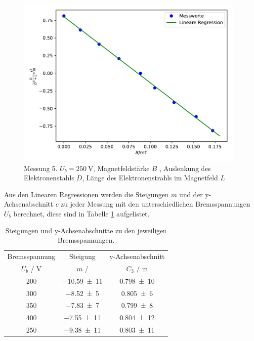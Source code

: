 \begin{figure}
  \centering
  \includegraphics[scale = 0.7]{Plot2.5.pdf}
  \caption{Messung 5. $ U_b = \SI{250}{\volt}$, Magnetfeldstärke $B$ , Auslenkung des Elektronenstahls $D$, Länge des Elektronenstrahls im Magnetfeld $L$}
  \label{abb:11}
\end{figure}


Aus den Linearen Regressionen werden die Steigungen $m$ und der y-Achsenabschnitt $c$ zu jeder Messung mit den unterschiedlichen
Bremsspannungen $U_b$ berechnet, diese sind in Tabelle \ref{tab:6} aufgelistet.


\begin{table}
  \centering
  \caption{Steigungen und y-Achsenabschnitte zu den jeweiligen Bremsspannungen.}
  \begin{tabular}{c | c c}
    \toprule
    Bremsspannung & Steigung & y-Achsenabschnitt \\
    $U_b$ / \si{\volt} & $m$ / \si{\sqrt{\kilo\coulomb\per\gram\volt}} & $C_3$ / \si{\meter} \\
    \midrule
    200 & \num{-10,59(11)} & \num{0,798(10)} \\
    300 & \num{-8,52(5)}   & \num{0,805(6)} \\
    350 & \num{-7,83(7)}   & \num{0,799(8)} \\
    400 & \num{-7,55(11)}  & \num{0,804(12)} \\
    250 & \num{-9,38(11)}  & \num{0,803(11)} \\
    \bottomrule
  \end{tabular}
  \label{tab:6}
\end{table}

